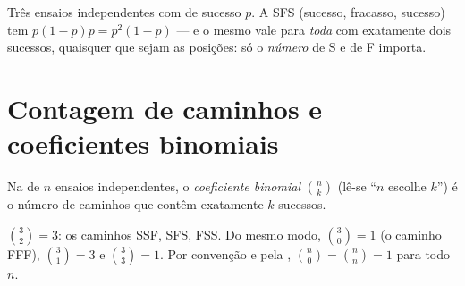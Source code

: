 \begin{example}\label{ex:g11:binom:threetrials}
Três ensaios independentes com  de sucesso $p$. A 
SFS (sucesso, fracasso, sucesso) tem  $p(1-p)p = p^2(1-p)$
--- e o mesmo vale para \emph{toda}  com exatamente dois
sucessos, quaisquer que sejam as posições: só o \emph{número} de S e de F
importa.
\end{example}

\section{Contagem de caminhos e coeficientes binomiais}

\begin{definition}\label{def:g11:binom:coefficient}
Na  de $n$ ensaios independentes, o \emph{coeficiente
binomial} $\binom{n}{k}$ (lê-se ``$n$ escolhe
$k$'') é o número de caminhos que contêm exatamente $k$ sucessos.
\end{definition}

\begin{example}
$\binom{3}{2} = 3$: os caminhos SSF, SFS, FSS. Do mesmo modo,
$\binom{3}{0} = 1$ (o caminho FFF), $\binom{3}{1} = 3$ e
$\binom{3}{3} = 1$. Por convenção e pela ,
$\binom n0 = \binom nn = 1$ para todo $n$.
\end{example}

